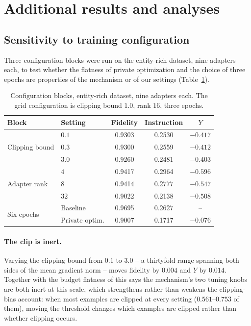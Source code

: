 \section{\label{apx:additional}Additional results and analyses}
\subsection{\label{apx:sensitivity}Sensitivity to training configuration}
Three configuration blocks were run on the entity-rich dataset,
nine adapters each,
to test whether the flatness of private optimization and the choice of three epochs are properties of the mechanism or of our settings (Table~\ref{tab:sensitivity}).

\begin{table}[t]
  \centering
  \caption{Configuration blocks, entity-rich dataset,
  nine adapters each.
  The grid configuration is clipping bound $1.0$,
  rank $16$,
  three epochs.}
  \label{tab:sensitivity}
  \begin{tabular}{llccc}
    \toprule
    Block & Setting & Fidelity & Instruction & $Y$ \\
    \midrule
    \multirow{3}{*}{Clipping bound}
      & $0.1$  & 0.9303 & 0.2530 & $-0.417$ \\
      & $0.3$  & 0.9300 & 0.2559 & $-0.412$ \\
      & $3.0$  & 0.9260 & 0.2481 & $-0.403$ \\
    \midrule
    \multirow{3}{*}{Adapter rank}
      & $4$    & 0.9417 & 0.2964 & $-0.596$ \\
      & $8$    & 0.9414 & 0.2777 & $-0.547$ \\
      & $32$   & 0.9022 & 0.2138 & $-0.508$ \\
    \midrule
    \multirow{2}{*}{Six epochs}
      & Baseline      & 0.9695 & 0.2627 & -- \\
      & Private optim.& 0.9007 & 0.1717 & $-0.076$ \\
    \bottomrule
  \end{tabular}
\end{table}

\paragraph{The clip is inert.}
Varying the clipping bound from $0.1$ to $3.0$ -- a thirtyfold range spanning both sides of the mean gradient norm -- moves fidelity by $0.004$ and $Y$ by $0.014$.
Together with the budget flatness of  this says the mechanism's two tuning knobs are both inert at this scale,
which strengthens rather than weakens the clipping-bias account:
when most examples are clipped at every setting ($0.561$--$0.753$ of them),
moving the threshold changes which examples are clipped rather than whether clipping occurs.

